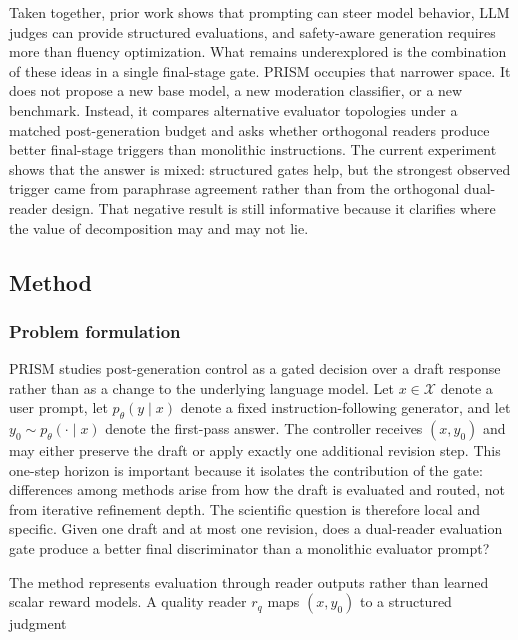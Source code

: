 \documentclass{article}
\begin{document}
Taken together, prior work shows that prompting can steer model behavior, LLM judges can provide structured evaluations, and safety-aware generation requires more than fluency optimization. What remains underexplored is the combination of these ideas in a single final-stage gate. PRISM occupies that narrower space. It does not propose a new base model, a new moderation classifier, or a new benchmark. Instead, it compares alternative evaluator topologies under a matched post-generation budget and asks whether orthogonal readers produce better final-stage triggers than monolithic instructions. The current experiment shows that the answer is mixed: structured gates help, but the strongest observed trigger came from paraphrase agreement rather than from the orthogonal dual-reader design. That negative result is still informative because it clarifies where the value of decomposition may and may not lie.

\subsection{Method}

\label{sec:method}

\subsubsection{Problem formulation}

\label{sec:problem_formulation}

PRISM studies post-generation control as a gated decision over a draft response rather than as a change to the underlying language model. Let \(x \in \mathcal{X}\) denote a user prompt, let \(p_\theta(y \mid x)\) denote a fixed instruction-following generator, and let \(y_0 \sim p_\theta(\cdot \mid x)\) denote the first-pass answer. The controller receives \((x, y_0)\) and may either preserve the draft or apply exactly one additional revision step. This one-step horizon is important because it isolates the contribution of the gate: differences among methods arise from how the draft is evaluated and routed, not from iterative refinement depth. The scientific question is therefore local and specific. Given one draft and at most one revision, does a dual-reader evaluation gate produce a better final discriminator than a monolithic evaluator prompt?

The method represents evaluation through reader outputs rather than learned scalar reward models. A quality reader \(r_q\) maps \((x, y_0)\) to a structured judgment
\end{document}
